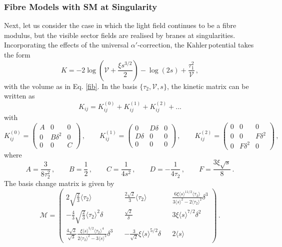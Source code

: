 \documentclass[11pt,a4paper]{article}
\newcommand{\V}{\mathcal{V}}
\newcommand{\Kahler}{\ensuremath{\text{K}\ddot{\text{a}}\text{hler}\,}}
\begin{document}
\subsubsection{Fibre Models with SM at Singularity}

Next, let us consider the case in which the light field continues to be a fibre modulus, but the visible sector fields are realised by branes at singularities. Incorporating the effects of the universal $\alpha'$-correction, the \Kahler potential takes the form
%
\begin{equation}
\label{fib}
  K = - 2 \log \left( {\V} + \frac{\xi s^{3/2}}{2}\right) - \log\left(2s\right)  + \frac{\tau_1^2}{\V} \,,
\end{equation}
with the volume as in Eq. \eqref{fib}. In the basis $\{\tau_2, \V, s\}$, the kinetic matrix can be written as
%
$$
  K_{ij} = K_{ij}^{(0)} + K_{ij}^{(1)} + K_{ij}^{(2)} + ...
$$
%
with
\begin{equation}
K_{ij}^{(0)} = 
\begin{pmatrix}
A & 0 & 0 \\
0 & B \delta^2 & 0 \\
0 & 0 & C
\end{pmatrix} \,, \qquad
K_{ij}^{(1)} = \begin{pmatrix}
0 & D \delta & 0 \\
D \delta & 0 & 0 \\
0 & 0 & 0
\end{pmatrix} \,, \qquad
K_{ij}^{(2)} = 
\begin{pmatrix}
0 &  0 & 0 \\
0 & 0 & F \delta^2 \\
0 & F \delta^2 & 0
\end{pmatrix} \,,
\end{equation}
where
\begin{equation}
A = \frac{3}{8 \tau_2^2} \,, \qquad B = \frac{1}{2} \,, \qquad C = \frac{1}{4 s^2} \,, \qquad D = - \frac{1}{4 \tau_2} \,, \qquad F = \frac{3 \xi \sqrt{s}}{8} \,.
\end{equation}
%
The basis change matrix is given by
%
\begin{equation}
\label{eq:RotationFibreSing}
\mathcal{M} = \begin{pmatrix}
2 \sqrt{\frac{2}{3}} \langle \tau_2 \rangle && \frac{2 \sqrt{2}}{3} \langle \tau_2 \rangle && \frac{6 \xi \langle s \rangle^{11/2} \langle \tau_2 \rangle}{3 \langle s \rangle^2 - 2 \langle \tau_2 \rangle^2} \delta^3 \\
-\frac{4}{3} \sqrt{\frac{2}{3}} \langle \tau_2 \rangle^2 \delta && \frac{\sqrt{2}}{\delta} && 3 \xi \langle s \rangle^{7/2} \delta^2 \\
\frac{4 \sqrt{2}}{\sqrt{3}} \frac{\xi \langle s \rangle^{5/2} \langle \tau_2 \rangle^4}{2 \langle \tau_2 \rangle^2 - 3 \langle s \rangle^2} \delta^3 && - \frac{3}{\sqrt{2}} \xi \langle s \rangle^{5/2} \delta && 2 \langle s \rangle
\end{pmatrix}\,.
\end{equation}
\end{document}
